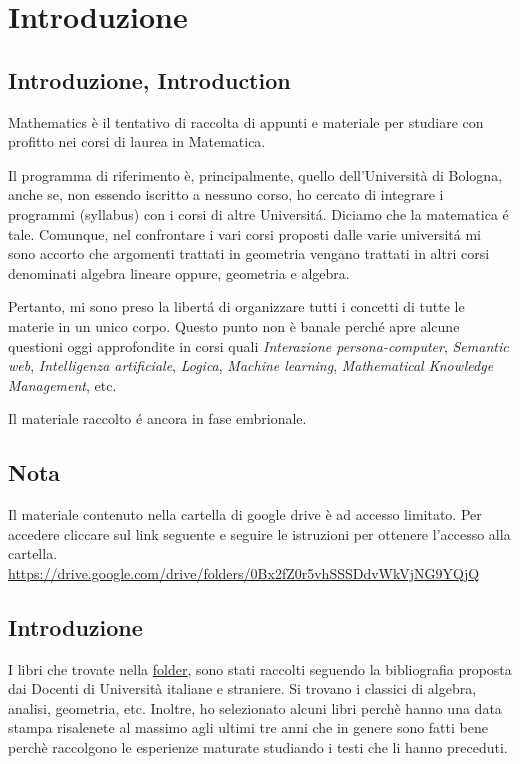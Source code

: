 \chapter{Introduzione}

\section{Introduzione, Introduction}		
Mathematics è il tentativo di raccolta di appunti e materiale per studiare con profitto nei corsi di laurea in Matematica.

Il programma di riferimento \`{e}, principalmente, quello dell'Universit\`{a}
di Bologna, anche se, non essendo iscritto a nessuno corso, ho cercato di integrare i programmi (syllabus) con i corsi di altre Universit\'{a}. Diciamo che la matematica \'{e} tale.
Comunque, nel confrontare i vari corsi proposti dalle varie universit\'{a} mi sono accorto che argomenti trattati in geometria vengano trattati in altri corsi denominati algebra lineare oppure, geometria e algebra.

Pertanto, mi sono preso la libert\'{a} di organizzare tutti i concetti di tutte le materie in un unico corpo. Questo punto non \`{e} banale perch\'{e} apre alcune questioni oggi
approfondite in corsi quali \textit{Interazione persona-computer}, \textit{Semantic web}, \textit{Intelligenza artificiale}, \textit{Logica}, \textit{Machine learning}, \textit{Mathematical Knowledge Management}, etc.

Il materiale raccolto \'{e} ancora in fase embrionale. 


\section*{Nota}
Il materiale contenuto nella cartella di google drive è ad accesso limitato. Per accedere cliccare sul link seguente e seguire le istruzioni per ottenere
l'accesso alla cartella. \url{https://drive.google.com/drive/folders/0Bx2fZ0r5vhSSSDdvWkVjNG9YQjQ}

\section*{Introduzione}
I libri che trovate nella \href{https://drive.google.com/drive/folders/0Bx2fZ0r5vhSSSDdvWkVjNG9YQjQ}{folder}, sono stati raccolti seguendo la bibliografia proposta dai Docenti di Università
italiane e straniere. Si trovano i classici di algebra, analisi, geometria, etc. Inoltre, ho selezionato alcuni libri perchè hanno una data stampa risalenete al massimo
agli ultimi tre anni che in genere sono fatti bene perchè raccolgono le esperienze maturate studiando i testi che li hanno preceduti.


